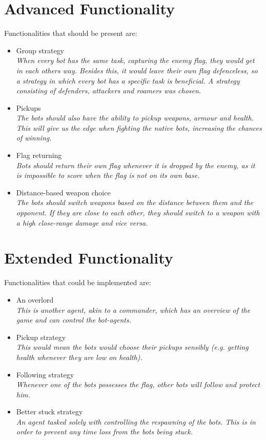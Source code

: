 \section{Advanced Functionality}
Functionalities that should be present are:
\begin{itemize}
	\item Group strategy \\
		\textit{When every bot has the same task, capturing the enemy flag, they would get in each others way. Besides this, it would leave their own flag defenceless, so a strategy in which every bot has a specific task is beneficial. A strategy consisting of defenders, attackers and roamers was chosen.}
	\item Pickups \\
		\textit{The bots should also have the ability to pickup weapons, armour and health. This will give us the edge when fighting the native bots, increasing the chances of winning.}
	\item Flag returning \\
		\textit{Bots should return their own flag whenever it is dropped by the enemy, as it is impossible to score when the flag is not on its own base.}
	\item Distance-based weapon choice \\
		\textit{The bots should switch weapons based on the distance between them and the opponent. If they are close to each other, they should switch to a weapon with a high close-range damage and vice versa.}
\end{itemize}

\section{Extended Functionality}
Functionalities that could be implemented are:
\begin{itemize}
	\item An overlord \\
		\textit{This is another agent, akin to a commander, which has an overview of the game and can control the bot-agents.}
	\item Pickup strategy \\
		\textit{This would mean the bots would choose their pickups sensibly (e.g. getting health whenever they are low on health).}
	\item Following strategy \\
		\textit{Whenever one of the bots possesses the flag, other bots will follow and protect him.}
	\item Better stuck strategy \\
		\textit{An agent tasked solely with controlling the respawning of the bots. This is in order to prevent any time loss from the bots being stuck.}
\end{itemize}

